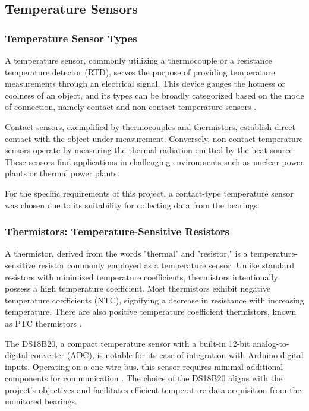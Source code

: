 \subsection{Temperature Sensors}

\subsubsection{Temperature Sensor Types}

A temperature sensor, commonly utilizing a thermocouple or a resistance temperature detector (RTD), serves the purpose of providing temperature measurements through an electrical signal. This device gauges the hotness or coolness of an object, and its types can be broadly categorized based on the mode of connection, namely contact and non-contact temperature sensors \cite{noauthor_temperature_2019}.

Contact sensors, exemplified by thermocouples and thermistors, establish direct contact with the object under measurement. Conversely, non-contact temperature sensors operate by measuring the thermal radiation emitted by the heat source. These sensors find applications in challenging environments such as nuclear power plants or thermal power plants.

For the specific requirements of this project, a contact-type temperature sensor was chosen due to its suitability for collecting data from the bearings.

\subsubsection{Thermistors: Temperature-Sensitive Resistors}

A thermistor, derived from the words "thermal" and "resistor," is a temperature-sensitive resistor commonly employed as a temperature sensor. Unlike standard resistors with minimized temperature coefficients, thermistors intentionally possess a high temperature coefficient. Most thermistors exhibit negative temperature coefficients (NTC), signifying a decrease in resistance with increasing temperature. There are also positive temperature coefficient thermistors, known as PTC thermistors \cite{noauthor_learn_nodate}.

The DS18B20, a compact temperature sensor with a built-in 12-bit analog-to-digital converter (ADC), is notable for its ease of integration with Arduino digital inputs. Operating on a one-wire bus, this sensor requires minimal additional components for communication \cite{noauthor_learn_nodate}. The choice of the DS18B20 aligns with the project's objectives and facilitates efficient temperature data acquisition from the monitored bearings.

